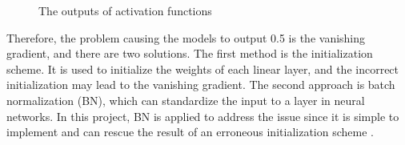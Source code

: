 \documentclass[12pt,twoside]{report}
\begin{document}
\begin{figure}[!htbp]
	\centering
	\hfill
	\hfill
	\hfil
	\hfil
	\caption{The outputs of activation functions}
	\label{vanish_gradient}
\end{figure}

Therefore, the problem causing the models to output 0.5 is the vanishing gradient, and there are two solutions. The first method is the initialization scheme. It is used to initialize the weights of each linear layer, and the incorrect initialization may lead to the vanishing gradient. The second approach is batch normalization (BN), which can standardize the input to a layer in neural networks. In this project, BN is applied to address the issue since it is simple to implement and can rescue the result of an erroneous initialization scheme \citep{RN5}. 
\\
\end{document}
